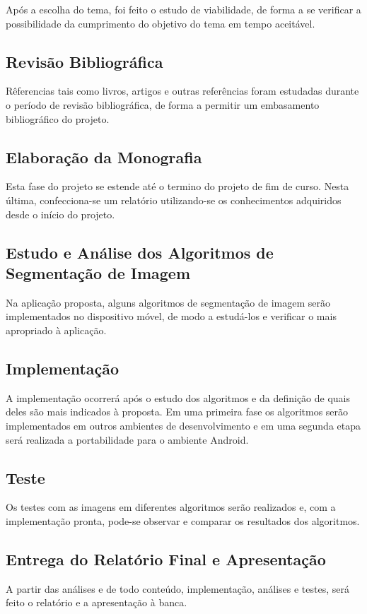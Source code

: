 Após a escolha do tema, foi feito o estudo de viabilidade, de forma a se verificar a possibilidade da cumprimento do objetivo do tema em tempo aceitável.

\subsection{Revisão Bibliográfica}
Rêferencias tais como livros, artigos e outras referências foram estudadas durante o período de revisão bibliográfica, de forma a permitir um embasamento bibliográfico do projeto.

\subsection{Elaboração da Monografia}
Esta fase do projeto se estende até o termino do projeto de fim de curso. Nesta última, confecciona-se um relatório utilizando-se os conhecimentos adquiridos desde o início do projeto.

\subsection{Estudo e Análise dos Algoritmos de Segmentação de Imagem}
Na aplicação proposta, alguns algoritmos de segmentação de imagem serão implementados no dispositivo móvel, de modo a estudá-los e verificar o mais apropriado à aplicação.

\subsection{Implementação}
A implementação ocorrerá após o estudo dos algoritmos e da definição de quais deles são mais indicados à proposta. Em uma primeira fase os algoritmos serão implementados em outros ambientes de desenvolvimento e em uma segunda etapa será realizada a portabilidade para o ambiente Android.

\subsection{Teste}
Os testes com as imagens em diferentes algoritmos serão realizados e, com a implementação pronta, pode-se observar e comparar os resultados dos algoritmos.

\subsection{Entrega do Relatório Final e Apresentação}
A partir das análises e de todo conteúdo, implementação, análises e testes, será feito o relatório e a apresentação à banca.


